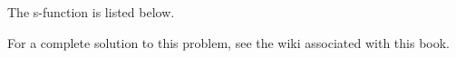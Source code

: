 
The s-function is listed below.
%
\ifsolutionmanual

\else

\fi

For a complete solution to this problem, see the wiki associated with this book.
